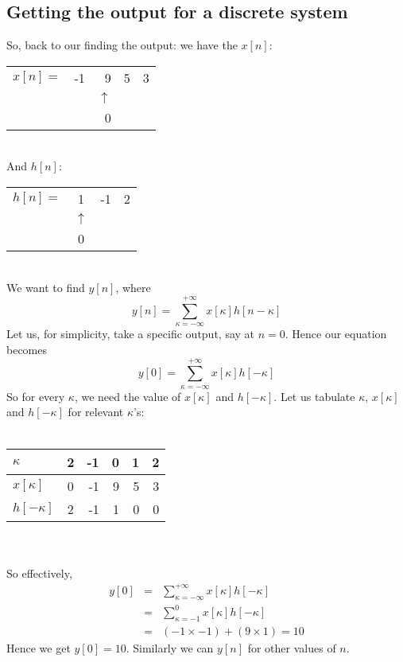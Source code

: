 \subsection{Getting the output for a discrete system}
So, back to our finding the output: we have the $x[n]$:\\
\begin{tabular}{ l  c r r r }
  $x[n] =$ & -1 & 9 & 5 & 3 \\
   &  & $\uparrow$ &  & \\
   &  & 0 &  & \\
\end{tabular}\\
And $h[n]$:\\
\begin{tabular}{ l  c r r  }
  $h[n] =$ & 1 & -1 & 2\\
     & $\uparrow$ &  & \\
     & 0 &  & \\
\end{tabular}\\
We want to find $y[n]$, where
\begin{equation}
y[n]=\sum_{\kappa=-\infty}^{+\infty} x[\kappa]h[n-\kappa] \nonumber
\end{equation}
Let us, for simplicity, take a specific output, say at $n=0$. Hence our equation becomes
\begin{equation}
y[0]=\sum_{\kappa=-\infty}^{+\infty} x[\kappa]h[-\kappa] \nonumber
\end{equation}
So for every $\kappa$, we need the value of $x[\kappa]$ and $h[-\kappa]$. Let us tabulate $\kappa$, $x[\kappa]$ and $h[-\kappa]$ for relevant  $\kappa$'s:\\\\
\begin{tabular}{| l | c r r r r | }
  \hline
  $\kappa$ & 2 & -1 & 0 & 1 & 2 \\
  \hline
  $x[\kappa]$ & 0 & -1 & 9 & 5 & 3\\
  $h[-\kappa]$ & 2 & -1 & 1 & 0 & 0 \\
  \hline
\end{tabular}\\\\
So effectively,
\begin{eqnarray*}
y[0]&=&\sum_{\kappa=-\infty}^{+\infty} x[\kappa]h[-\kappa] \nonumber \\
       &=&\sum_{\kappa=-1}^{0} x[\kappa]h[-\kappa] \nonumber \\
       &=&(-1\times -1)+(9\times 1)=10
\end{eqnarray*}
Hence we get $y[0]=10$. Similarly we can $y[n]$ for other values of $n$.

